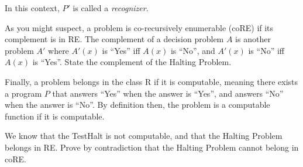 \documentclass[11pt]{article}
\begin{document}
\begin{Parts}
  In this context, $P'$ is called a \emph{recognizer}.
\normalfont

\Part As you might suspect, a problem is co-recursively enumerable (\textsf{coRE}) if its complement is in \textsf{RE}. The complement of a decision problem $A$ is another problem $A'$ where $A'(x)$ is ``Yes'' iff $A(x)$ is ``No'', and $A'(x)$ is ``No'' iff $A(x)$ is ``Yes''.
State the complement of the Halting Problem.

\Part Finally, a problem belongs in the class \textsf{R} if it is computable, meaning there exists a program $P$ that answers ``Yes'' when the answer is ``Yes'', and answers ``No'' when the answer is ``No''. By definition then, the problem is a computable function if it is computable.

We know that the TestHalt is not computable, and that the Halting Problem belongs in \textsf{RE}. Prove by contradiction that the Halting Problem cannot belong in \textsf{coRE}.

\end{Parts}

\pagebreak
{}
\end{document}
